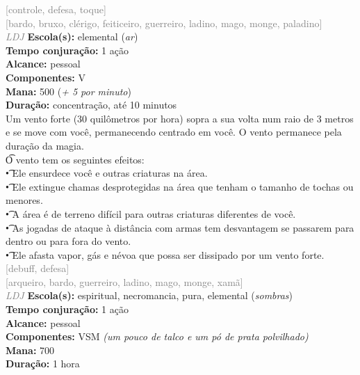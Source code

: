 \documentclass{RPG_Adventure}[2021/10/20]
\begin{document}
{\scriptsize \textcolor{gray}{[controle, defesa, toque]\\}}
{\scriptsize \textcolor{gray}{[bardo, bruxo, clérigo, feiticeiro, guerreiro, ladino, mago, monge, paladino]\\}}
{\tiny \textcolor{gray}{\textit{LDJ}}}\jump{}
{\small \t \textbf{Escola(s):} elemental (\textit{ar})\\\t \textbf{Tempo conjuração:} 1 ação\\\t \textbf{Alcance:} pessoal\\\t \textbf{Componentes:} V\\\t \textbf{Mana:} 500 (\textit{+ 5 por minuto})\\\t \textbf{Duração:} concentração, até 10 minutos\\}
{\normalsize Um vento forte (30 quilômetros por hora) sopra a sua volta num raio de 3 metros e se move com você, permanecendo centrado em você. O vento permanece pela duração da magia.\\\t O vento tem os seguintes efeitos:\\\t • Ele ensurdece você e outras criaturas na área.\\\t • Ele extingue chamas desprotegidas na área que tenham o tamanho de tochas ou menores.\\\t • A área é de terreno difícil para outras criaturas diferentes de você.\\\t • As jogadas de ataque à distância com armas tem desvantagem se passarem para dentro ou para fora do vento.\\\t • Ele afasta vapor, gás e névoa que possa ser dissipado por um vento forte.\\}
{\scriptsize \textcolor{gray}{[debuff, defesa]\\}}
{\scriptsize \textcolor{gray}{[arqueiro, bardo, guerreiro, ladino, mago, monge, xamã]\\}}
{\tiny \textcolor{gray}{\textit{LDJ}}}\jump{}
{\small \t \textbf{Escola(s):} espiritual, necromancia, pura, elemental (\textit{sombras})\\\t \textbf{Tempo conjuração:} 1 ação\\\t \textbf{Alcance:} pessoal\\\t \textbf{Componentes:} VSM \textit{(um pouco de talco e um pó de prata polvilhado)}\\\t \textbf{Mana:} 700\\\t \textbf{Duração:} 1 hora\\}
\end{document}
